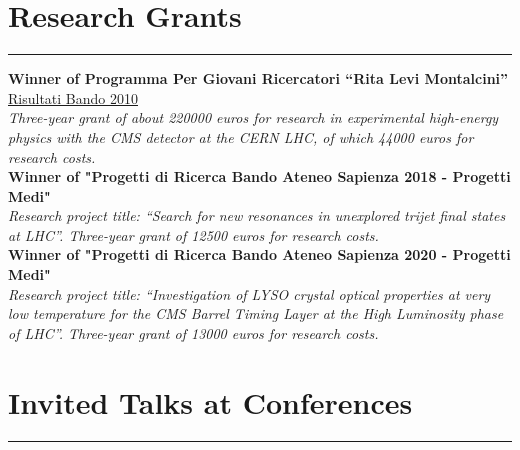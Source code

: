 \documentclass[10pt, a4paper]{article}
\newcommand{\years}[1]{\marginnote{\hskip-0.2in{\scriptsize #1}}}
\begin{document}

\section*{Research Grants}
\vspace{-5pt}
\hrule
\vspace{10pt}
\years{08/2013}\textbf{Winner of Programma Per Giovani
  Ricercatori ``Rita Levi Montalcini''} \\ 
 \href{http://cervelli.cineca.it/ProgGiovRic/dm050813_683.pdf}{Risultati Bando 2010} \\
\emph{Three-year grant of about 220000 euros for research in experimental high-energy
  physics with the CMS detector at the CERN LHC, of which 44000 euros for research costs.}\\

\years{02/2019}\textbf{Winner of "Progetti di Ricerca Bando Ateneo
  Sapienza 2018 - Progetti Medi" } \\ 
\emph{Research project title: ``Search for new resonances in
  unexplored trijet final states at LHC''. Three-year grant of 12500 euros for research costs.}\\

\years{12/2020}\textbf{Winner of "Progetti di Ricerca Bando Ateneo
  Sapienza 2020 - Progetti Medi" } \\ 
\emph{Research project title: ``Investigation of LYSO crystal optical properties at very low temperature for the CMS Barrel Timing Layer at the High Luminosity phase of LHC''. Three-year grant of 13000 euros for research costs.}


\section*{Invited Talks at Conferences}
\vspace{-5pt}
\hrule
\vspace{10pt}
\noindent
\end{document}
